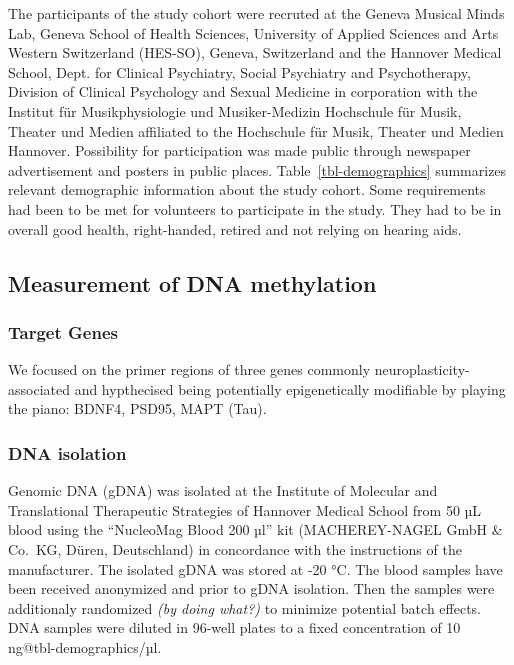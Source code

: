 \documentclass[
  letterpaper,
  DIV=11,
  numbers=noendperiod]{scrartcl}
\begin{document}
The participants of the study cohort were recruted at the Geneva Musical
Minds Lab, Geneva School of Health Sciences, University of Applied
Sciences and Arts Western Switzerland (HES-SO), Geneva, Switzerland and
the Hannover Medical School, Dept. for Clinical Psychiatry, Social
Psychiatry and Psychotherapy, Division of Clinical Psychology and Sexual
Medicine in corporation with the Institut für Musikphysiologie und
Musiker-Medizin Hochschule für Musik, Theater und Medien affiliated to
the Hochschule für Musik, Theater und Medien Hannover. Possibility for
participation was made public through newspaper advertisement and
posters in public places. Table~\ref{tbl-demographics} summarizes
relevant demographic information about the study cohort. Some
requirements had been to be met for volunteers to participate in the
study. They had to be in overall good health, right-handed, retired and
not relying on hearing aids.

\subsection{Measurement of DNA
methylation}\label{measurement-of-dna-methylation}

\subsubsection{Target Genes}\label{target-genes}

We focused on the primer regions of three genes commonly
neuroplasticity-associated and hypthecised being potentially
epigenetically modifiable by playing the piano: BDNF4, PSD95, MAPT
(Tau).

\subsubsection{DNA isolation}\label{dna-isolation}

Genomic DNA (gDNA) was isolated at the Institute of Molecular and
Translational Therapeutic Strategies of Hannover Medical School from 50
µL blood using the ``NucleoMag Blood 200 µl'' kit (MACHEREY-NAGEL GmbH
\& Co.~KG, Düren, Deutschland) in concordance with the instructions of
the manufacturer. The isolated gDNA was stored at -20 °C. The blood
samples have been received anonymized and prior to gDNA isolation. Then
the samples were additionaly randomized \emph{(by doing what?)} to
minimize potential batch effects. DNA samples were diluted in 96-well
plates to a fixed concentration of 10 ng@tbl-demographics/µl.
\end{document}
